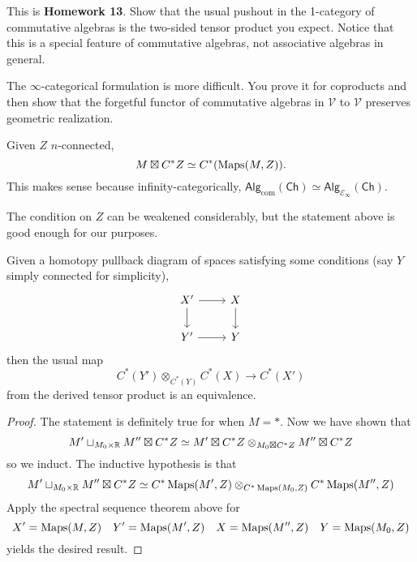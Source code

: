 \documentclass{amsart}
\begin{document}
\begin{exercise}
    This is \textbf{Homework 13}. Show that the usual pushout in the 1-category of commutative algebras
    is the two-sided tensor product you expect. Notice that this is a special feature
    of commutative algebras, not associative algebras in general.

    The $\infty$-categorical formulation is more difficult. You prove it for coproducts
    and then show that the forgetful functor of commutative algebras in $\mathcal{V}$ to $\mathcal{V}$
    preserves geometric realization.
\end{exercise}

\begin{theorem}
    Given $Z$ $n$-connected,
    \begin{equation*}
        M\boxtimes C^*Z \simeq C^*(\operatorname{Maps}(M,Z)).
    \end{equation*}
    This makes sense because infinity-categorically, $\mathsf{Alg}_\text{com}(\mathsf{Ch})\simeq\mathsf{Alg}_{\mathcal{E}_\infty}(\mathsf{Ch})$.
\end{theorem}

\begin{remark}
    The condition on $Z$ can be weakened considerably, but the statement above is good
    enough for our purposes.
\end{remark}

\begin{theorem}
    Given a homotopy pullback diagram of spaces satisfying some conditions (say $Y$ simply connected for simplicity),
    \begin{equation*}
        \begin{tikzcd}
            X' \rar\dar & X\dar \\
            Y' \rar & Y
        \end{tikzcd}
    \end{equation*}
    then the usual map
    \begin{equation*}
        C^*(Y')\otimes_{C^*(Y)}C^*(X)\to C^*(X')
    \end{equation*}
    from the derived tensor product is an equivalence.
\end{theorem}

\begin{proof}
    The statement is definitely true for when $M=*$. Now we have shown that
    \begin{equation*}
        M'\sqcup_{M_0\times\mathbb{R}}M'' \boxtimes C^*Z \simeq M'\boxtimes C^*Z\otimes_{M_0\boxtimes C^*Z}M''\boxtimes C^*Z
    \end{equation*}
    so we induct. The inductive hypothesis is that
    \begin{equation*}
        M'\sqcup_{M_0\times\mathbb{R}}M'' \boxtimes C^*Z \simeq C^*\operatorname{Maps}(M',Z)\otimes_{C^*\operatorname{Maps}(M_0,Z)}C^*\operatorname{Maps}(M'',Z)
    \end{equation*}
    Apply the spectral sequence theorem above for
    \begin{equation*}
        X'=\operatorname{Maps}(M,Z)\quad Y'=\operatorname{Maps}(M',Z)\quad X=\operatorname{Maps}(M'',Z)\quad Y=\operatorname{Maps}(M_0,Z)
    \end{equation*}
    yields the desired result.
\end{proof}
\end{document}
